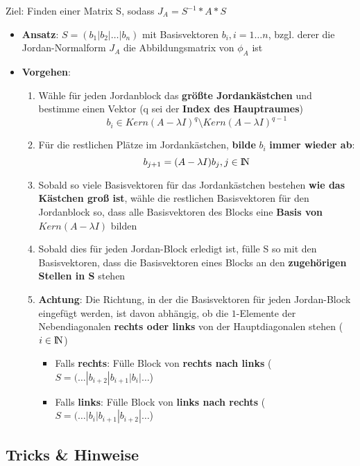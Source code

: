 \documentclass[10pt,a4paper]{article}
\def\naturalnumbers{{\rm I\!N}}
\begin{document}
	Ziel: Finden einer Matrix S, sodass $J_A = S^{-1} * A * S$
	\begin{itemize}
		\item \textbf{Ansatz}: $S = (b_1 | b_2 | \dots | b_n)$ mit Basisvektoren $b_i, i = 1 \dots n$, bzgl. derer die Jordan-Normalform $J_A$ die Abbildungsmatrix von $\phi_A$ ist
		\item \textbf{Vorgehen}:
		\begin{enumerate}
			\item Wähle für jeden Jordanblock das \textbf{größte Jordankästchen} und bestimme einen Vektor (q sei der \textbf{Index des Hauptraumes}) $$b_i \in Kern(A - \lambda I)^q \setminus Kern(A - \lambda I)^{q-1}$$
			\item Für die restlichen Plätze im Jordankästchen, \textbf{bilde} $b_i$ \textbf{immer wieder ab}: $$b_{j+1} = (A - \lambda I)b_j, j \in \naturalnumbers$$
			\item Sobald so viele Basisvektoren für das Jordankästchen bestehen \textbf{wie das Kästchen groß ist}, wähle die restlichen Basisvektoren für den Jordanblock so, dass alle Basisvektoren des Blocks eine \textbf{Basis von} $Kern(A - \lambda I)$ bilden
			\item Sobald dies für jeden Jordan-Block erledigt ist, fülle S so mit den Basisvektoren, dass die Basisvektoren eines Blocks an den \textbf{zugehörigen Stellen in S} stehen
			\item \textbf{Achtung}: Die Richtung, in der die Basisvektoren für jeden Jordan-Block eingefügt werden, ist davon abhängig, ob die $1$-Elemente der Nebendiagonalen \textbf{rechts oder links} von der Hauptdiagonalen stehen ($i \in \naturalnumbers$)
			\begin{itemize}
				\item Falls \textbf{rechts}: Fülle Block von \textbf{rechts nach links} ($S = (\dots | b_{i+2} | b_{i+1} | b_{i} | \dots$)
				\item Falls \textbf{links}: Fülle Block von \textbf{links nach rechts} ($S = (\dots | b_{i} | b_{i+1} | b_{i+2} | \dots$)
			\end{itemize}
		\end{enumerate}
	\end{itemize}

	\subsection{Tricks \& Hinweise}
	\label{jd:sub:tricks}
	
\end{document}
